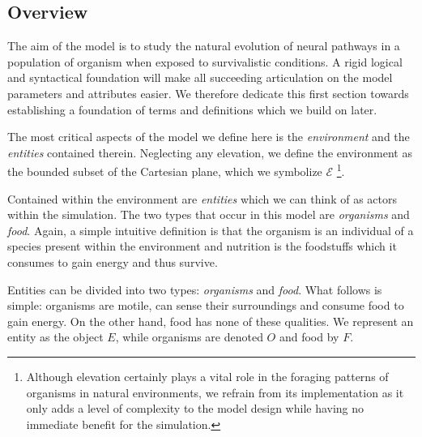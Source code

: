 \documentclass[a4paper, 12pt]{report}
\theoremstyle{definition}
\begin{document}
\subsection{Overview}
The aim of the model is to study the natural evolution of neural pathways in a population of organism
when exposed to survivalistic conditions. A rigid logical and syntactical foundation will make all succeeding
articulation on the model parameters and attributes easier. We therefore dedicate this first section towards
establishing a foundation of terms and definitions which we build on later.
\par The most critical aspects of the model we define here is the \emph{environment} and the \emph{entities} contained
therein. Neglecting any elevation, we define the environment as the bounded subset of the Cartesian plane, which we symbolize
$\mathscr E$ \footnote{Although elevation certainly plays a vital role in the foraging patterns of organisms in natural environments, we refrain
from its implementation as it only adds a level of complexity to the model design while having no immediate benefit for the simulation.}.
\par Contained within the environment are \emph{entities} which we can think of as actors within the simulation. The two types that occur
in this model are \emph{organisms} and \emph{food}. Again, a simple intuitive definition is that the organism is an individual of a species
present within the environment and nutrition is the foodstuffs which it consumes to gain energy and thus survive.
\par Entities can be divided into two types: \emph{organisms} and \emph{food}. What follows is simple: organisms are motile, can sense their surroundings
and consume food to gain energy. On the other hand, food has none of these qualities. We represent an entity as the object $E$, while organisms are denoted
$O$ and food by $F$.
\end{document}

